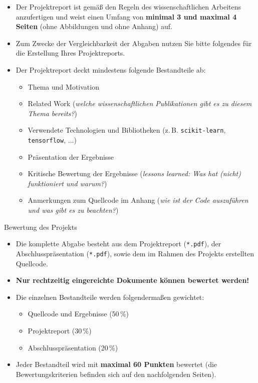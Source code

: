 \begin{frame}
	\begin{itemize}
		\item Der Projektreport ist gemäß den Regeln des wissenschaftlichen Arbeitens anzufertigen und weist einen Umfang von
			\textbf{minimal 3 und maximal 4 Seiten} (ohne Abbildungen und ohne Anhang) auf.
		\item Zum Zwecke der Vergleichbarkeit der Abgaben nutzen Sie bitte folgendes \template{} für die Erstellung Ihres Projektreports.
		\item Der Projektreport deckt mindestens folgende Bestandteile ab:
		\begin{itemize}
			\item Thema und Motivation
			\item Related Work (\textit{welche wissenschaftlichen Publikationen gibt es zu diesem Thema bereits?})
			\item Verwendete Technologien und Bibliotheken (z.\,B. \texttt{scikit-learn}, \texttt{tensorflow}, ...)
			\item Präsentation der Ergebnisse
			\item Kritische Bewertung der Ergebnisse (\textit{\glqq{}lessons learned\grqq{}: Was hat (nicht) funktioniert und warum?})
			\item Anmerkungen zum Quellcode im Anhang (\textit{wie ist der Code auszuführen und was gibt es zu beachten?})
		\end{itemize}
	\end{itemize}
\end{frame}


\begin{dwHeaderFrame}{Bewertung des Projekts}
	\begin{itemize}
		\item Die komplette Abgabe besteht aus dem Projektreport (\texttt{*.pdf}), der Abschlusspräsentation (\texttt{*.pdf}),
			sowie dem im Rahmen des Projekts erstellten Quellcode.
		\item \textbf{Nur rechtzeitig eingereichte Dokumente können bewertet werden!}
		\item Die einzelnen Bestandteile werden folgendermaßen gewichtet:
		\begin{itemize}
			\item Quellcode und Ergebnisse (50\,\%)
			\item Projektreport (30\,\%)
			\item Abschlusspräsentation (20\,\%)
		\end{itemize}
		\item Jeder Bestandteil wird mit \textbf{maximal 60 Punkten} bewertet (die Bewertungskriterien befinden sich auf den nachfolgenden Seiten).
	\end{itemize}

\end{dwHeaderFrame}


